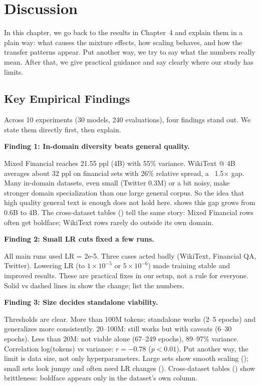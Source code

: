 \chapter{Discussion}

In this chapter, we go back to the results in Chapter~4 and explain them in a plain way: what causes the mixture effects, how scaling behaves, and how the transfer patterns appear. Put another way, we try to say what the numbers really mean. After that, we give practical guidance and say clearly where our study has limits.

\section{Key Empirical Findings}

Across 10 experiments (30 models, 240 evaluations), four findings stand out. We state them directly first, then explain.

\textbf{Finding 1: In-domain diversity beats general quality.}

Mixed Financial reaches 21.55 ppl (4B) with 55\% variance. WikiText @ 4B averages about 32 ppl on financial sets with 26\% relative spread, a ~1.5$\times$ gap. Many in-domain datasets, even small (Twitter 0.3M) or a bit noisy, make stronger domain specialization than one large general corpus. So the idea that high quality general text is enough does not hold here.  shows this gap grows from 0.6B to 4B. The cross-dataset tables () tell the same story: Mixed Financial rows often get boldface; WikiText rows rarely do outside its own domain.

\textbf{Finding 2: Small LR cuts fixed a few runs.}

All main runs used LR = 2e-5. Three cases acted badly (WikiText, Financial QA, Twitter). Lowering LR (to $1\times10^{-5}$ or $5\times10^{-6}$) made training stable and improved results. These are practical fixes in our setup, not a rule for everyone. Solid vs dashed lines in  show the change;  list the numbers.

\textbf{Finding 3: Size decides standalone viability.}

Thresholds are clear. More than 100M tokens: standalone works (2--5 epochs) and generalizes more consistently. 20--100M: still works but with caveats (6--30 epochs). Less than 20M: not viable alone (67--249 epochs), 89--97\% variance. Correlation log(tokens) vs variance: $r = -0.78$ ($p < 0.01$). Put another way, the limit is data size, not only hyperparameters. Large sets show smooth scaling (); small sets look jumpy and often need LR changes (). Cross-dataset tables () show brittleness: boldface appears only in the dataset's own column.

